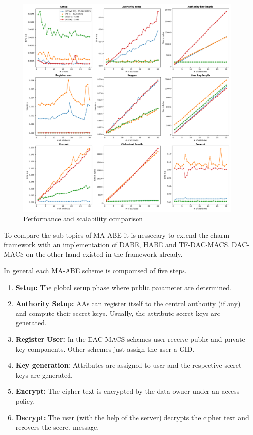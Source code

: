 \begin{figure}[!ht]
\centering
    \includegraphics[width=1\linewidth]{img/maabe_comparisons.png}
    \caption{Performance and scalability comparison}
    \label{fig:maabe_comparison}
\end{figure}

To compare the sub topics of \ac{MA-ABE} it is nessecary to extend the charm framework with an implementation of \ac{DABE}, \ac{HABE} and \ac{TF-DAC-MACS}. \ac{DAC-MACS} on the other hand existed in the framework already. 

In general each \ac{MA-ABE} scheme is compomsed of five steps. 
\begin{enumerate}
	\item \textbf{Setup:} The global setup phase where public parameter are determined.
	\item \textbf{Authority Setup:} \ac{AA}s can register itself to the central authority (if any) and compute their secret keys. Usually, the attribute secret keys are generated. 
	\item \textbf{Register User:} In the \ac{DAC-MACS} schemes user receive public and private key components. Other schemes just assign the user a \ac{GID}.
	\item \textbf{Key generation:} Attributes are assigned to user and the respective secret keys are generated.
	\item \textbf{Encrypt:} The cipher text is encrypted by the data owner under an access policy.
	\item \textbf{Decrypt:} The user (with the help of the server) decrypts the cipher text and recovers the secret message. 
\end{enumerate}

